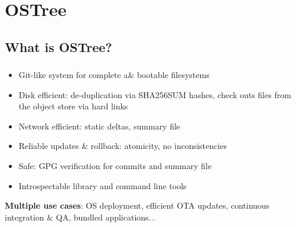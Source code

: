 %
%
%

\section{OSTree}
\subsection{What is OSTree?}

\begin{frame}
  \frametitle{\insertsubsection}

  \begin{itemize}
  \item Git-like system for complete a\& bootable filesystems\vspacing
  \item Disk efficient: de-duplication via SHA256SUM hashes, check outs files from the object store via hard links\vspacing
  \item Network efficient: static deltas, summary file\vspacing
  \item Reliable updates \& rollback: atomicity, no inconsistencies\vspacing
  \item Safe: GPG verification for commits and summary file\vspacing
  \item Introspectable library and command line tools
  \end{itemize}

  \begin{flushleft}
    \textbf{Multiple use cases}: OS deployment, efficient OTA updates, continuous integration \& QA, bundled applications...
  \end{flushleft}
\end{frame}

